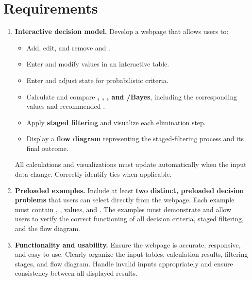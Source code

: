 	\section*{Requirements}
	\begin{enumerate}[label=\textbf{\arabic*.},leftmargin=*]
		
		\item \textbf{Interactive decision model.}
		Develop a webpage that allows users to:
		\begin{itemize}
			\item Add, edit, and remove  and   .
			\item Enter and modify  values in an interactive table.
			\item Enter and adjust state  for probabilistic criteria.
			\item Calculate and compare \textbf{, ,  , and /Bayes}, including the corresponding values and recommended .
			\item Apply \textbf{staged filtering} and visualize each elimination step.
			\item Display a \textbf{flow diagram} representing the staged-filtering process and its final outcome.
		\end{itemize}
		
		All calculations and visualizations must update automatically when the input data change. Correctly identify ties when applicable.
		
		\item \textbf{Preloaded examples.}
		Include at least \textbf{two distinct, preloaded decision problems} that users can select directly from the webpage. Each example must contain ,   ,  values, and . The examples must demonstrate and allow users to verify the correct functioning of all decision criteria, staged filtering, and the flow diagram.
		
		\item \textbf{Functionality and usability.}
		Ensure the webpage is accurate, responsive, and easy to use. Clearly organize the input tables, calculation results, filtering stages, and flow diagram. Handle invalid inputs appropriately and ensure consistency between all displayed results.
		

\end{enumerate}
